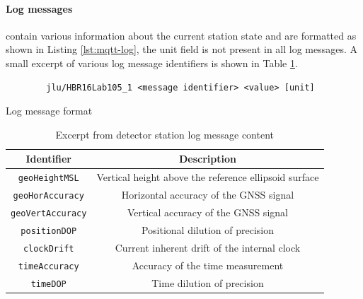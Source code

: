 \documentclass[abstract,toc,los,lof,english,10pt,glossary,acronyms,lotl]{jluthesis}
\begin{document}
\paragraph{Log messages} contain various information about the current station state and are formatted as shown in Listing \ref{lst:mqtt-log}, the unit field is not present in all log messages. A small excerpt of various log message identifiers is shown in Table \ref{tab:station_logs}.
\begin{lstfloat}[H]
	\centering
	\begin{verbatim}
		jlu/HBR16Lab105_1 <message identifier> <value> [unit]
	\end{verbatim}
	\caption{Log message format}
	\label{lst:mqtt-log}
\end{lstfloat}
\begin{table}[H]
	\centering
	\begin{tabular}{| c | c |}
		\hline
		\textbf{Identifier} & \textbf{Description} \\
		\hline
		\verb*|geoHeightMSL| & Vertical height above the reference ellipsoid surface \\
		\hline
		\verb*|geoHorAccuracy| & Horizontal accuracy of the GNSS signal \\
		\hline
		\verb*|geoVertAccuracy| & Vertical accuracy of the GNSS signal \\
		\hline
		\verb*|positionDOP| & Positional dilution of precision\footnotemark \\
		\hline
		\verb*|clockDrift| & Current inherent drift of the internal clock\\
		\hline
		\verb*|timeAccuracy| & Accuracy of the time measurement \\
		\hline
		\verb*|timeDOP| & Time dilution of precision \\
		\hline
	\end{tabular}
	\caption{Excerpt from detector station log message content}
	\label{tab:station_logs}
\end{table}
\end{document}
